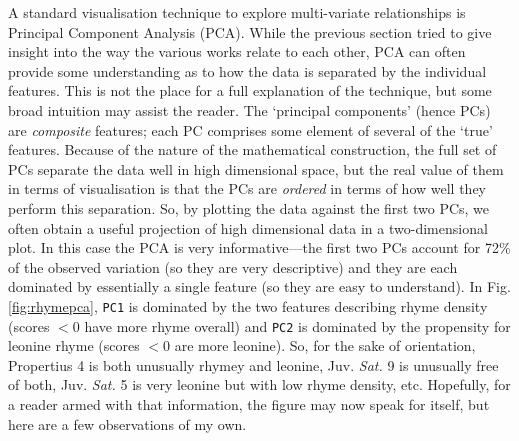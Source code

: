 \documentclass[twocolumn, switch]{article} %
\begin{document}
A standard visualisation technique to explore multi-variate relationships is
Principal Component Analysis (PCA). While the previous section tried to give
insight into the way the various works relate to each other, PCA can often
provide some understanding as to how the data is separated by the individual
features. This is not the place for a full explanation of the technique, but
some broad intuition may assist the reader. The `principal components' (hence
PCs) are \emph{composite} features; each PC comprises some element of several
of the `true' features. Because of the nature of the mathematical
construction, the full set of PCs separate the data well in high dimensional
space, but the real value of them in terms of visualisation is that the PCs
are \emph{ordered} in terms of how well they perform this separation. So, by
plotting the data against the first two PCs, we often obtain a useful
projection of high dimensional data in a two-dimensional plot. In this case
the PCA is very informative---the first two PCs account for 72\% of the
observed variation (so they are very descriptive) and they are each dominated
by essentially a single feature (so they are easy to understand). In Fig.
\ref{fig:rhymepca}, \texttt{PC1} is dominated by the two features describing
rhyme density (scores $<0$ have more rhyme overall) and \texttt{PC2} is
dominated by the propensity for leonine rhyme (scores $<0$ are more leonine).
So, for the sake of orientation, Propertius 4 is both unusually rhymey and
leonine, Juv. \emph{Sat.} 9 is unusually free of both, Juv. \emph{Sat.} 5 is
very leonine but with low rhyme density, etc. Hopefully, for a reader armed
with that information, the figure may now speak for itself, but here are a few
observations of my own.
\end{document}

